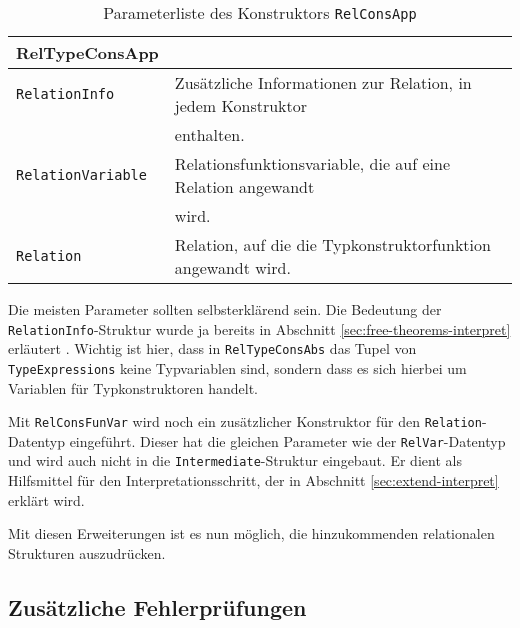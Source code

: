 \begin{table}[th]
\begin{tabular}{ | l | l | }
\hline
RelTypeConsApp & \\
\hline
\texttt{RelationInfo} & Zusätzliche Informationen zur Relation, in jedem Konstruktor \\
& enthalten. \\
\texttt{RelationVariable} & Relationsfunktionsvariable, die auf eine Relation angewandt\\
& wird. \\
\texttt{Relation} & Relation, auf die die Typkonstruktorfunktion angewandt wird. \\
\hline
\end{tabular}
\caption{Parameterliste des Konstruktors \texttt{RelConsApp}}
\label{tab:reltypeconsapp}
\end{table}

Die meisten Parameter sollten selbsterklärend sein. Die Bedeutung der \texttt{RelationInfo}-Struktur wurde ja bereits in Abschnitt \ref{sec:free-theorems-interpret} erläutert . Wichtig ist hier, dass in \texttt{RelTypeConsAbs} das
Tupel von \texttt{TypeExpressions} keine Typvariablen sind, sondern dass es sich hierbei um Variablen für Typkonstruktoren handelt.

Mit \texttt{RelConsFunVar} wird noch ein zusätzlicher Konstruktor für den \texttt{Relation}-Datentyp eingeführt. Dieser hat
die gleichen Parameter wie der \texttt{RelVar}-Datentyp und wird auch nicht in die \texttt{Intermediate}-Struktur eingebaut.
Er dient als Hilfsmittel für den Interpretationsschritt, der in Abschnitt \ref{sec:extend-interpret} erklärt wird.

Mit diesen Erweiterungen ist es nun möglich, die hinzukommenden relationalen Strukturen auszudrücken.


\subsection{Zusätzliche Fehlerprüfungen}

\label{sec:erweiterung-typklassen-fehler}


